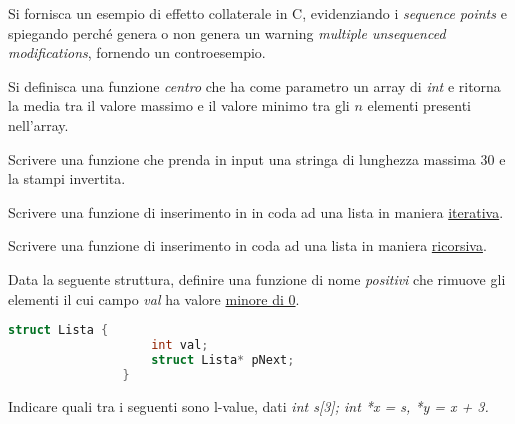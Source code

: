 \documentclass[addpoints,11pt]{exam}
\begin{document}
\begin{questions}
\begin{minipage}[t]{0.5\linewidth}
\begin{lstlisting}[language=C]
			\end{lstlisting}
		\end{minipage}
		\begin{minipage}[t]{0.5\linewidth}
			\makeemptybox{145pt}
		\end{minipage}
		
		
		
		\question[1]
		Si fornisca un esempio di effetto collaterale in C, evidenziando i \emph{sequence points} e spiegando perché genera o non genera un warning \emph{multiple unsequenced modifications}, fornendo un controesempio.
		\makeemptybox{75pt}
		
		
		
		\question[2]
		Si definisca una funzione \emph{centro} che ha come parametro un array di \emph{int} e ritorna la media tra il valore massimo e il valore minimo tra gli $n$ elementi presenti nell'array.
		\makeemptybox{100pt}
		
		
		
		\question[2]
		Scrivere una funzione che prenda in input una stringa di lunghezza massima 30 e la stampi invertita.
		\makeemptybox{100pt}
		
		
		
		\question[1]
		Scrivere una funzione di inserimento in in coda ad una lista in maniera \underline{iterativa}.
		\makeemptybox{100pt}
		
		
		
		\question[2]
		Scrivere una funzione di inserimento in coda ad una lista in maniera \underline{ricorsiva}.
		\makeemptybox{100pt}
		
		
		
		\question[4]
		Data la seguente struttura, definire una funzione di nome \emph{positivi} che rimuove gli elementi il cui campo \emph{val} ha valore \underline{minore di 0}.
		
		\begin{minipage}{0.3\linewidth}
			\begin{lstlisting}[language=C]
				struct Lista {
					int val;
					struct Lista* pNext;
				}
			\end{lstlisting}
		\end{minipage}
		\begin{minipage}{0.7\linewidth}
			\makeemptybox{100pt}
		\end{minipage}
		
		
		
		\question[1]
		Indicare quali tra i seguenti sono l-value, dati \emph{int s[3]; int *x = s, *y = x + 3.}
		

\end{questions}
\end{document}
